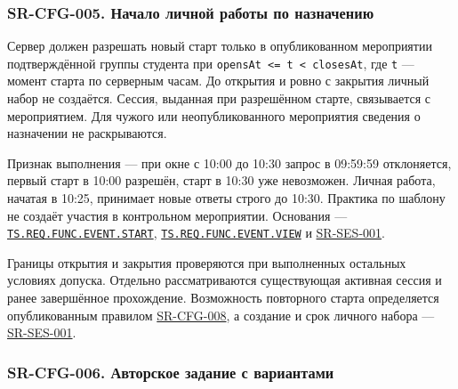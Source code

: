 \documentclass[12pt,a4paper]{article}
\begin{document}
\subsubsection{SR-CFG-005. Начало личной работы по назначению}\label{sr-cfg-005-ux43dux430ux447ux430ux43bux43e-ux43bux438ux447ux43dux43eux439-ux440ux430ux431ux43eux442ux44b-ux43fux43e-ux43dux430ux437ux43dux430ux447ux435ux43dux438ux44e}

\hypertarget{sr-cfg-005-начало-личной-работы-по-назначению}{}

\hypertarget{sr-cfg-005}{}

Сервер должен разрешать новый старт только в опубликованном мероприятии подтверждённой группы студента при \texttt{opensAt\ \textless{}=\ t\ \textless{}\ closesAt}, где \texttt{t} --- момент старта по серверным часам. До открытия и ровно с закрытия личный набор не создаётся. Сессия, выданная при разрешённом старте, связывается с мероприятием. Для чужого или неопубликованного мероприятия сведения о назначении не раскрываются.

Признак выполнения --- при окне с 10:00 до 10:30 запрос в 09:59:59 отклоняется, первый старт в 10:00 разрешён, старт в 10:30 уже невозможен. Личная работа, начатая в 10:25, принимает новые ответы строго до 10:30. Практика по шаблону не создаёт участия в контрольном мероприятии. Основания --- {\href{../02\_Техническое\_задание/Техническое\_задание.pdf\#ts-req-func-event-start}{\texttt{TS.\allowbreak{}REQ.\allowbreak{}FUNC.\allowbreak{}EVENT.\allowbreak{}START}}}, {\href{../02\_Техническое\_задание/Техническое\_задание.pdf\#ts-req-func-event-view}{\texttt{TS.\allowbreak{}REQ.\allowbreak{}FUNC.\allowbreak{}EVENT.\allowbreak{}VIEW}}} и {\hyperlink{sr-ses-001}{SR-SES-001}}.

Границы открытия и закрытия проверяются при выполненных остальных условиях допуска. Отдельно рассматриваются существующая активная сессия и ранее завершённое прохождение. Возможность повторного старта определяется опубликованным правилом {\hyperlink{sr-cfg-008}{SR-CFG-008}}, а создание и срок личного набора --- {\hyperlink{sr-ses-001}{SR-SES-001}}.

\subsubsection{SR-CFG-006. Авторское задание с вариантами}\label{sr-cfg-006-ux430ux432ux442ux43eux440ux441ux43aux43eux435-ux437ux430ux434ux430ux43dux438ux435-ux441-ux432ux430ux440ux438ux430ux43dux442ux430ux43cux438}
\end{document}
